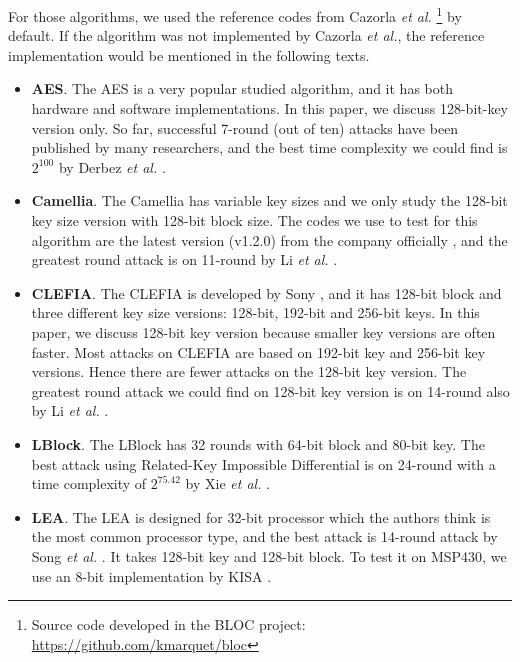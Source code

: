\documentclass[sigconf, review=false]{acmart}
\begin{document}
For those algorithms, we used the reference codes from Cazorla \textit{et al.}
\footnote{Source code developed in the BLOC project: \url{https://github.com/kmarquet/bloc}} by default.
If the algorithm was not implemented by Cazorla \textit{et al.}, the reference implementation would be mentioned in the following texts.

\begin{itemize}
    \item
\textbf{AES}. The AES \cite{pub2001197} is a very popular studied algorithm, and it has both hardware and software implementations.
In this paper, we discuss 128-bit-key version only. So far, successful 7-round (out of ten) attacks have been published by many researchers,
and the best time complexity we could find is $2^{100}$ by Derbez \textit{et al.} \cite{derbez2013improved}.

    \item
\textbf{Camellia}. The Camellia \cite{aoki2000camellia} has variable key sizes and we only study the 128-bit key size version with 128-bit block size.
The codes we use to test for this algorithm are the latest version (v1.2.0) from the company officially \cite{ntt2007},
and the greatest round attack is on 11-round by Li \textit{et al.} \cite{li2015meet}.

    \item
\textbf{CLEFIA}. The CLEFIA \cite{shirai2007128} is developed by Sony \cite{sony2008},
and it has 128-bit block and three different key size versions: 128-bit, 192-bit and 256-bit keys.
In this paper, we discuss 128-bit key version because smaller key versions are often faster.
Most attacks on CLEFIA are based on 192-bit key and 256-bit key versions. Hence there are fewer attacks on the 128-bit key version.
The greatest round attack we could find on 128-bit key version is on 14-round also by Li \textit{et al.} \cite{li2015meet}.

    \item
\textbf{LBlock}. The LBlock \cite{wu2011lblock} has 32 rounds with 64-bit block and 80-bit key.
The best attack using Related-Key Impossible Differential is on 24-round with a time complexity of $2^{75.42}$ by Xie \textit{et al.} \cite{xie2017related}.

    \item
\textbf{LEA}. The LEA \cite{hong2013lea} is designed for 32-bit processor which the authors think is the most common processor type,
and the best attack is 14-round attack by Song \textit{et al.} \cite{song2016automatic}.
It takes 128-bit key and 128-bit block. To test it on MSP430, we use an 8-bit implementation by KISA \cite{kisa2015}.


\end{itemize}
\end{document}
